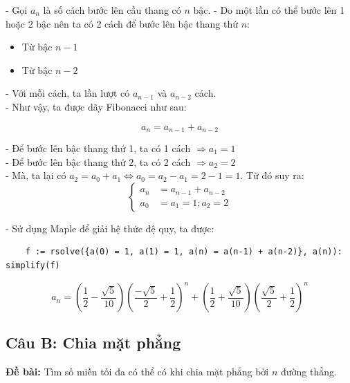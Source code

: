 \documentclass[12pt]{article}
\begin{document}
\begin{sloppypar}
- Gọi \(a_{n}\) là số cách bước lên cầu thang có \(n\) bậc.
- Do một lần có thể bước lên 1 hoặc 2 bậc nên ta có 2 cách để bước lên bậc thang thứ \(n\):

\begin{itemize}
    \item Từ bậc \(n - 1\)
    \item Từ bậc \(n - 2\)
\end{itemize}

- Với mỗi cách, ta lần lượt có \(a_{n-1}\) và \(a_{n - 2}\) cách. \\
- Như vậy, ta được dãy Fibonacci như sau:

\begin{equation*}
    a_{n} = a_{n-1} + a_{n-2}
\end{equation*}

- Để bước lên bậc thang thứ 1, ta có 1 cách \(\Rightarrow a_{1} = 1\) \\
- Để bước lên bậc thang thứ 2, ta có 2 cách \(\Rightarrow a_{2} = 2\) \\
- Mà, ta lại có \(a_{2} = a_{0} + a_{1} \Leftrightarrow a_{0} = a_{2} - a_{1} = 2 - 1 = 1\). Từ đó suy ra: \\


    \[
    \begin{cases}
        a_{n} & = a_{n-1} + a_{n-2} \\             
        a_{0} & = a_{1} = 1; a_{2} = 2   
    \end{cases}
    \]

- Sử dụng Maple để giải hệ thức đệ quy, ta được:

\begin{verbatim}
    f := rsolve({a(0) = 1, a(1) = 1, a(n) = a(n-1) + a(n-2)}, a(n)): simplify(f)
\end{verbatim}

\begin{equation*}
    a_{n} = \left(\frac{1}{2} - \frac{\sqrt{5}}{10}\right)\left(\frac{-\sqrt{5}}{2} + \frac{1}{2}\right)^{n} + \left(\frac{1}{2} + \frac{\sqrt{5}}{10}\right)\left(\frac{\sqrt{5}}{2} + \frac{1}{2}\right)^{n}
\end{equation*}

\subsection{Câu B: Chia mặt phẳng}
\begin{tcolorbox}
    \textbf{Đề bài:} Tìm số miền tối đa có thể có khi chia mặt phẳng bởi \(n\) đường thẳng.
\end{tcolorbox}


\end{sloppypar}
\end{document}
